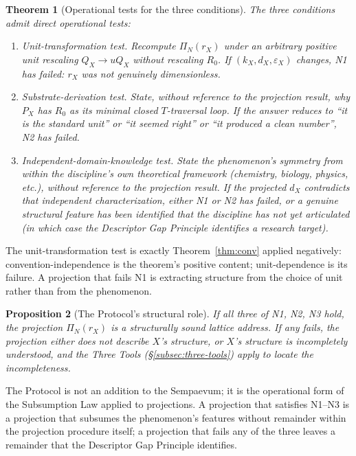 \documentclass[11pt,a4paper]{article}
\newtheorem{theorem}{Theorem}[section]
\newtheorem{proposition}[theorem]{Proposition}
\theoremstyle{definition}
\theoremstyle{remark}
\begin{document}
\begin{theorem}[Operational tests for the three conditions]\label{thm:N1N2N3}
The three conditions admit direct operational tests:
\begin{enumerate}[leftmargin=*]
\item[\textbf{(N1)}] \emph{Unit-transformation test.} Recompute $\Pi_{N}(r_{X})$ under an arbitrary positive unit rescaling $Q_{X} \to uQ_{X}$ without rescaling $R_{0}$. If $(k_{X}, d_{X}, \varepsilon_{X})$ changes, N1 has failed: $r_{X}$ was not genuinely dimensionless.
\item[\textbf{(N2)}] \emph{Substrate-derivation test.} State, without reference to the projection result, why $P_{X}$ has $R_{0}$ as its minimal closed $T$-traversal loop. If the answer reduces to ``it is the standard unit'' or ``it seemed right'' or ``it produced a clean number'', N2 has failed.
\item[\textbf{(N3)}] \emph{Independent-domain-knowledge test.} State the phenomenon's symmetry from within the discipline's own theoretical framework (chemistry, biology, physics, etc.), without reference to the projection result. If the projected $d_{X}$ contradicts that independent characterization, either N1 or N2 has failed, or a genuine structural feature has been identified that the discipline has not yet articulated (in which case the Descriptor Gap Principle identifies a research target).
\end{enumerate}
\end{theorem}

The unit-transformation test is exactly Theorem~\ref{thm:conv} applied negatively: convention-independence is the theorem's positive content; unit-dependence is its failure. A projection that fails N1 is extracting structure from the choice of unit rather than from the phenomenon.

\begin{proposition}[The Protocol's structural role]\label{prop:N1N2N3-role}
If all three of N1, N2, N3 hold, the projection $\Pi_{N}(r_{X})$ is a structurally sound lattice address. If any fails, the projection either does not describe $X$'s structure, or $X$'s structure is incompletely understood, and the Three Tools (\S\ref{subsec:three-tools}) apply to locate the incompleteness.
\end{proposition}

The Protocol is not an addition to the Sempaevum; it is the operational form of the Subsumption Law applied to projections. A projection that satisfies N1--N3 is a projection that subsumes the phenomenon's features without remainder within the projection procedure itself; a projection that fails any of the three leaves a remainder that the Descriptor Gap Principle identifies.
\end{document}
